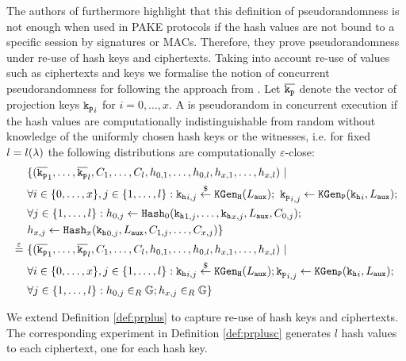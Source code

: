 \noindent
The authors of \cite{Katz2011} furthermore highlight that this definition of pseudorandomness is not enough when used in PAKE protocols if the hash values are not bound to a specific session by signatures or MACs.
Therefore, they prove pseudorandomness under re-use of hash keys and ciphertexts.
Taking into account re-use of \SPHFF values such as ciphertexts and keys we formalise the notion of concurrent pseudorandomness for \SPHFF following the approach from \cite{Katz2011}.
Let $\overline{\mathtt{k_p}}$ denote the vector of projection keys $\mathtt{k_p}_i$ for $i=0,\dots,x$.
A \SPHFF is pseudorandom in concurrent execution if the hash values are computationally indistinguishable from random without knowledge of the uniformly chosen hash keys or the witnesses, i.e. for fixed $l=l(\lambda)$ the following distributions are computationally $\varepsilon$-close:
\begin{align*}
& \{(\overline{\mathtt{k_p}}_1,\dots,\overline{\mathtt{k_p}}_l,C_1,\dots,C_l,h_{0,1},\dots, h_{0,l},h_{x,1},\dots, h_{x,l}) ~|~ \\
&  \forall i\in\{0,\dots, x\}, j\in\{1,\dots,l\}: \mathtt{k_h}_{i,j}\stackrel{\$}{\gets}\mathtt{KGen_H}(L_\mathtt{aux});~ \mathtt{k_p}_{i,j}\gets\mathtt{KGen_P}(\mathtt{k_h}_i,L_\mathtt{aux}); \\
&  \forall j\in\{1,\dots,l\}: h_{0,j}\gets\mathtt{Hash}_0(\mathtt{k_h}_{1,j},\dots,\mathtt{k_h}_{x,j},L_\mathtt{aux},C_{0,j}); \\
&  h_{x,j}\gets\mathtt{Hash}_x(\mathtt{k_h}_{0,j}, L_\mathtt{aux},C_{1,j},\dots,C_{x,j})\} \\
\stackrel{\varepsilon}{=}~ & \{(\overline{\mathtt{k_p}}_1,\dots,\overline{\mathtt{k_p}}_l,C_1,\dots,C_l,h_{0,1},\dots, h_{0,l},h_{x,1},\dots, h_{x,l}) ~|~ \\
&  \forall i\in\{0,\dots, x\}, j\in\{1,\dots,l\}: \mathtt{k_h}_{i,j}\stackrel{\$}{\gets}\mathtt{KGen_H}(L_\mathtt{aux}); \mathtt{k_p}_{i,j}\gets\mathtt{KGen_P}(\mathtt{k_h}_i,L_\mathtt{aux}); \\
&  \forall j\in\{1,\dots,l\}: h_{0,j}\in_R\mathbb{G}; h_{x,j}\in_R\mathbb{G}\}
\end{align*}

\noindent
We extend Definition \ref{def:prplus} to capture re-use of hash keys and ciphertexts.
The corresponding experiment in Definition \ref{def:prplusc}
generates $l$ hash values to each ciphertext, one for each hash key.

